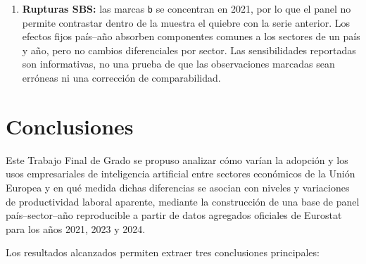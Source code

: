 \documentclass[12pt,a4paper]{article}
\begin{document}
\begin{enumerate}
    \item \textbf{Rupturas SBS:} las marcas \texttt{b} se concentran en 2021, por lo que el panel no permite contrastar dentro de la muestra el quiebre con la serie anterior. Los efectos fijos país--año absorben componentes comunes a los sectores de un país y año, pero no cambios diferenciales por sector. Las sensibilidades reportadas son informativas, no una prueba de que las observaciones marcadas sean erróneas ni una corrección de comparabilidad.

\end{enumerate}

\section{Conclusiones}

Este Trabajo Final de Grado se propuso analizar cómo varían la adopción y los usos empresariales de inteligencia artificial entre sectores económicos de la Unión Europea y en qué medida dichas diferencias se asocian con niveles y variaciones de productividad laboral aparente, mediante la construcción de una base de panel país--sector--año reproducible a partir de datos agregados oficiales de Eurostat para los años 2021, 2023 y 2024.

Los resultados alcanzados permiten extraer tres conclusiones principales:
\end{document}
